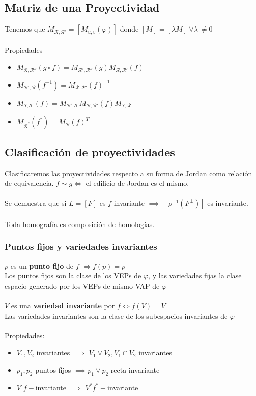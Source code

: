 \documentclass[leqno]{article}
\begin{document}
\subsection{Matriz de una Proyectividad}
Tenemos que $M_{\mathcal{R}, \mathcal{R}'} = [M_{u, v}(\varphi )]$ donde $[M] = [\lambda M]\ \forall \lambda\ \neq 0$ \\
\\
Propiedades
\begin{itemize}
  \item $M_{\mathcal{R}, \mathcal{R}''}(g\circ f)=M_{\mathcal{R}', \mathcal{R}''}(g)M_{\mathcal{R}, \mathcal{R}'}(f)$
  \item $M_{\mathcal{R}', \mathcal{R}}(f^{-1}) = M_{\mathcal{R}, \mathcal{R}'}(f)^{-1}$ 
  \item $M_{\mathcal{S}, \mathcal{S}'}(f) = M_{\mathcal{R}', \mathcal{S}'}M_{\mathcal{R}, \mathcal{R}'}(f) M_{\mathcal{S}, \mathcal{R}}$
  \item $M_{\mathcal{R}^*}(f^*) = M_{\mathcal{R}}(f)^{T}$ 
\end{itemize}

\subsection{Clasificación de proyectividades}
Clasificaremos las proyectividades respecto a su forma de Jordan como relación de equivalencia. $f\sim g \iff$
el edificio de Jordan es el mismo. \\
\\
Se demuestra que si $L = [F]$ es $f$-invariante $\implies$ $[\rho^{-1}(F^\perp)]$ es invariante.\\
\\

Toda homografía es composición de homologías.

\subsubsection{Puntos fijos y variedades invariantes}
$p$ es un \textbf{punto fijo} de  $f$ $\iff f(p)=p$\\
Los puntos fijos son la clase de los VEPs de $\varphi $, y las variedades fijas la clase espacio generado por los VEPs de mismo VAP de $\varphi $ \\
\\
$V$ es una \textbf{variedad invariante} por  $f \iff f(V) = V$\\
Las variedades invariantes son la clase de los subespacios invariantes de $\varphi $ \\
\\
Propiedades:
\begin{itemize}
  \item $V_1, V_2$ invariantes $\implies$ $V_1\lor V_2, V_1\cap V_2$ invariantes
  \item $p_1, p_2$ puntos fijos $\implies p_1\lor p_2$ recta invariante 
  \item $V$ $f-$invariante  $\implies$ $V^* f^*-$invariante
\end{itemize}
\end{document}
